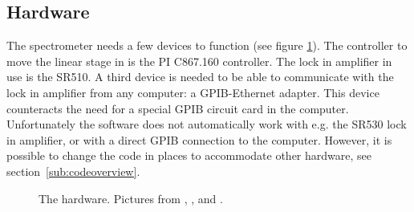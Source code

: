 \subsection{Hardware}

The spectrometer needs a few devices to function (see figure \ref{fig:hardware}). The controller to move the linear stage in is the PI C867.160 controller. The lock in amplifier in use is the SR510. A third device is needed to be able to communicate with the lock in amplifier from any computer: a GPIB-Ethernet adapter. This device counteracts the need for a special GPIB circuit card in the computer. Unfortunately the software does not automatically work with e.g. the SR530 lock in amplifier, or with a direct GPIB connection to the computer. However, it is possible to change the code in places to accommodate other hardware, see section~\ref{sub:codeoverview}.

\begin{figure}[h!tb]
	\begin{center}
		\qquad
		\qquad
		\caption{The hardware. Pictures from \cite{PI}, \cite{SR}, and \cite{prologix}.}
		\label{fig:hardware}
	\end{center}
\end{figure}

